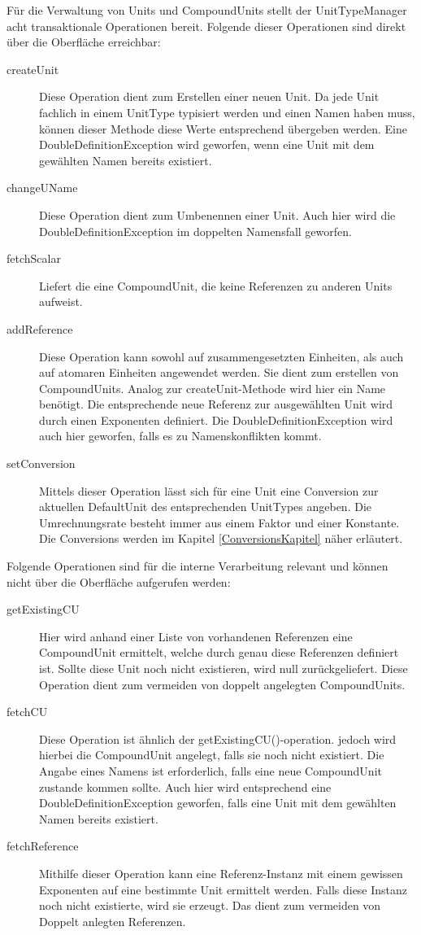 
Für die Verwaltung von Units und CompoundUnits stellt der UnitTypeManager acht transaktionale Operationen bereit.
Folgende dieser Operationen sind direkt über die Oberfläche erreichbar:

\begin{description}
\item[createUnit]
Diese Operation dient zum Erstellen einer neuen Unit. Da jede Unit fachlich in einem UnitType typisiert werden und einen Namen haben muss, können dieser Methode diese Werte entsprechend übergeben werden. Eine DoubleDefinitionException wird geworfen, wenn eine Unit mit dem gewählten Namen bereits existiert.
\item[changeUName]
Diese Operation dient zum Umbenennen einer Unit. Auch hier wird die DoubleDefinitionException im doppelten Namensfall geworfen.
\item[fetchScalar]
Liefert die eine CompoundUnit, die keine Referenzen zu anderen Units aufweist.
\item[addReference]
Diese Operation kann sowohl auf zusammengesetzten Einheiten, als auch auf atomaren Einheiten angewendet werden. Sie dient zum erstellen von CompoundUnits. Analog zur createUnit-Methode wird hier ein Name benötigt. Die entsprechende neue Referenz zur ausgewählten Unit wird durch einen Exponenten definiert. Die DoubleDefinitionException wird auch hier geworfen, falls es zu Namenskonflikten kommt.
\item[setConversion]
Mittels dieser Operation lässt sich für eine Unit eine Conversion zur aktuellen DefaultUnit des entsprechenden UnitTypes angeben. Die Umrechnungsrate besteht immer aus einem Faktor und einer Konstante. Die Conversions werden im Kapitel \ref{ConversionsKapitel} näher erläutert.
\end{description}

Folgende Operationen sind für die interne Verarbeitung relevant und können nicht über die Oberfläche aufgerufen werden:
\begin{description}

\item[getExistingCU]
Hier wird anhand einer Liste von vorhandenen Referenzen eine CompoundUnit ermittelt, welche durch genau diese Referenzen definiert ist. Sollte diese Unit noch nicht existieren, wird null zurückgeliefert. Diese Operation dient zum vermeiden von doppelt angelegten CompoundUnits.
\item[fetchCU]
Diese Operation ist ähnlich der getExistingCU()-operation. jedoch wird hierbei die CompoundUnit angelegt, falls sie noch nicht existiert. Die Angabe eines Namens ist erforderlich, falls eine neue CompoundUnit zustande kommen sollte. Auch hier wird entsprechend eine DoubleDefinitionException geworfen, falls eine Unit mit dem gewählten Namen bereits existiert.
\item[fetchReference]
Mithilfe dieser Operation kann eine Referenz-Instanz mit einem gewissen Exponenten auf eine bestimmte Unit ermittelt werden. Falls diese Instanz noch nicht existierte, wird sie erzeugt. Das dient zum vermeiden von Doppelt anlegten Referenzen.
\end{description}

